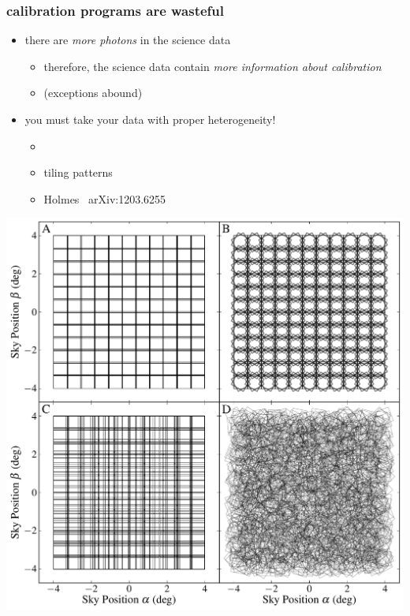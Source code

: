 \documentclass[pdftex]{beamer}
\begin{document}
\begin{frame}
  \frametitle{calibration programs are wasteful}
  \begin{itemize}
  \item there are \emph{more photons} in the science data
    \begin{itemize}
    \item therefore, the science data contain \emph{more information about calibration}
    \item (exceptions abound)
    \end{itemize}
  \item you must take your data with proper heterogeneity!
    \begin{itemize}
    \item \kepler
    \item tiling patterns
    \item Holmes \etal\ arXiv:1203.6255
    \end{itemize}
  \end{itemize}
\end{frame}

\begin{frame}
\includegraphics[height=0.9\textheight]{./simple_surveys.pdf}
\end{frame}
\end{document}
